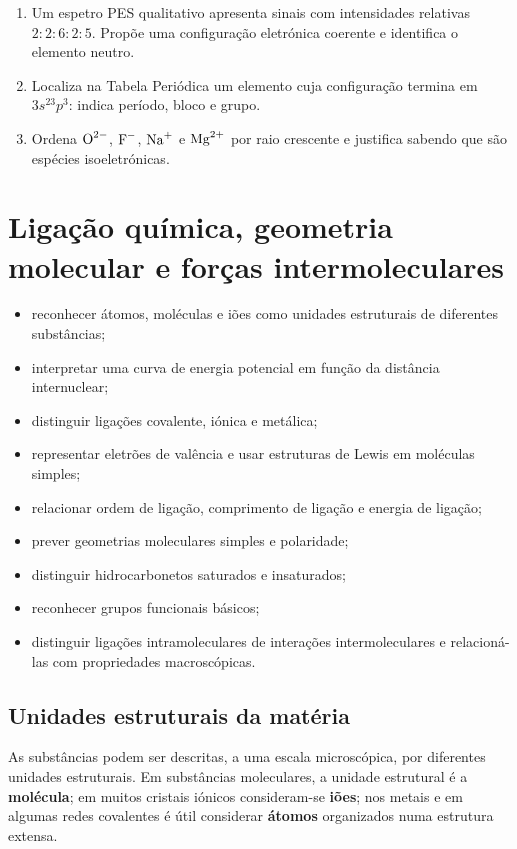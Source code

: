 \documentclass[11pt,a4paper,oneside]{book}
\begin{document}
\begin{exercicios}
\begin{enumerate}
  \item Um espetro PES qualitativo apresenta sinais com intensidades relativas $2:2:6:2:5$. Propõe uma configuração eletrónica coerente e identifica o elemento neutro.
  \item Localiza na Tabela Periódica um elemento cuja configuração termina em $3s^23p^3$: indica período, bloco e grupo.
  \item Ordena $\ce{O^{2-}}$, $\ce{F^-}$, $\ce{Na+}$ e $\ce{Mg^{2+}}$ por raio crescente e justifica sabendo que são espécies isoeletrónicas.
\end{enumerate}
\end{exercicios}

\chapter{Ligação química, geometria molecular e forças intermoleculares}

\begin{objetivos}
\begin{itemize}
  \item reconhecer átomos, moléculas e iões como unidades estruturais de diferentes substâncias;
  \item interpretar uma curva de energia potencial em função da distância internuclear;
  \item distinguir ligações covalente, iónica e metálica;
  \item representar eletrões de valência e usar estruturas de Lewis em moléculas simples;
  \item relacionar ordem de ligação, comprimento de ligação e energia de ligação;
  \item prever geometrias moleculares simples e polaridade;
  \item distinguir hidrocarbonetos saturados e insaturados;
  \item reconhecer grupos funcionais básicos;
  \item distinguir ligações intramoleculares de interações intermoleculares e relacioná-las com propriedades macroscópicas.
\end{itemize}
\end{objetivos}


\section{Unidades estruturais da matéria}
As substâncias podem ser descritas, a uma escala microscópica, por diferentes unidades estruturais. Em substâncias moleculares, a unidade estrutural é a \textbf{molécula}; em muitos cristais iónicos consideram-se \textbf{iões}; nos metais e em algumas redes covalentes é útil considerar \textbf{átomos} organizados numa estrutura extensa.
\end{document}
